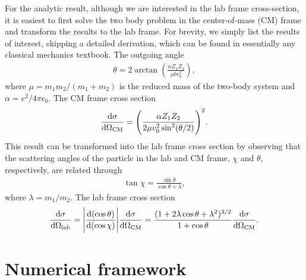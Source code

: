 For the analytic result, although we are interested in the lab frame cross-section, it is easiest to first solve the two body problem in the center-of-mass (CM) frame and transform the results to the lab frame.
For brevity, we simply list the results of interest, skipping a detailed derivation, which can be found in essentially any classical mechanics textbook.
The outgoing angle 
\begin{align}
    \theta = 2 \arctan(\frac{\alpha Z_1 Z_2}{\mu b v_0^2})
,\end{align}
where $\mu = m_1 m_2 / (m_1 + m_2)$ is the reduced mass of the two-body system and $\alpha = e^2 / 4 \pi \epsilon_0$.
The CM frame cross section
\begin{align}
    \dv{\sigma}{\Omega_{\rm CM}} = \Bigg( \frac{\alpha Z_1 Z_2}{2 \mu v_0^2 \sin^2(\theta/2)} \Bigg)^2
.\end{align}
This result can be transformed into the lab frame cross section by observing that the scattering angles of the particle in the lab and CM frame, $\chi$ and $\theta$, respectively, are related through
\begin{align}
    \tan{\chi} = \frac{\sin{\theta}}{\cos{\theta} + \lambda}
,\end{align}
where $\lambda = m_1/m_2$.
The lab frame cross section
\begin{align}
    \dv{\sigma}{\Omega_{\rm lab}} = \Bigg| \dv{(\cos{\theta})}{(\cos{\chi})} \Bigg| \dv{\sigma}{\Omega_{\rm CM}} = \frac{(1 + 2 \lambda \cos{\theta} + \lambda^2)^{3/2}}{1 + \cos{\theta}} \dv{\sigma}{\Omega_{\rm CM}}
.\end{align}


\section{Numerical framework}
\label{sec:numerical-framework}

